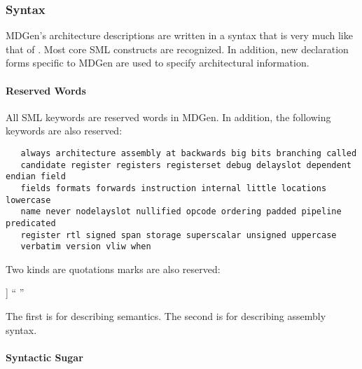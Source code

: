 \subsubsection{Syntax}

   MDGen's architecture descriptions are written in a syntax that is very
much like that of 
. 
Most core SML constructs are recognized.  
In addition, new declaration forms specific to MDGen are 
used to specify architectural information.

\paragraph{Reserved Words}
   All SML keywords are reserved words in MDGen.
   In addition, the following keywords are also reserved:

\begin{verbatim}
   always architecture assembly at backwards big bits branching called
   candidate register registers registerset debug delayslot dependent endian field
   fields formats forwards instruction internal little locations lowercase
   name never nodelayslot nullified opcode ordering padded pipeline predicated
   register rtl signed span storage superscalar unsigned uppercase 
   verbatim version vliw when
\end{verbatim}

   Two kinds are quotations marks are also reserved:   
\begin{SML}
   [[ ]]
   `` ''
\end{SML}

   The first \sml{[[ ]]} is for describing semantics.  The
second  is for describing assembly syntax.

\paragraph{Syntactic Sugar}

